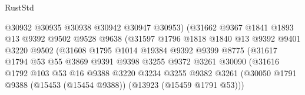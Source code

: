 \begin{lexlean}{RustStd}
\begin{coremodule}
                                  @30932
                                  @30935
                                  @30938
                                  @30942
                                  @30947
                                  @30953)
                                (@31662
                                  @9367
                                  @1841
                                  @1893
                                  @13
                                  @9392
                                  @9502
                                  @9528
                                  @9638
                                  (@31597
                                    @1796
                                    @1818
                                    @1840
                                    @13
                                    @9392
                                    @9401
                                    @3220
                                    @9502
                                    (@31608
                                      @1795
                                      @1014
                                      @19384
                                      @9392
                                      @9399
                                      @8775
                                      (@31617
                                        @1794
                                        @53
                                        @55
                                        @3869
                                        @9391
                                        @9398
                                        @3255
                                        @9372
                                        @3261
                                        @30090
                                        (@31616
                                          @1792
                                          @103
                                          @53
                                          @16
                                          @9388
                                          @3220
                                          @3234
                                          @3255
                                          @9382
                                          @3261
                                          (@30050
                                            @1791
                                            @9388
                                            (@15453 (@15454 @9388))
                                            (@13923 (@15459 @1791 @53)))

\end{coremodule}
\end{lexlean}
